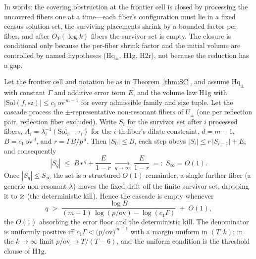 In words: the covering obstruction at the frontier cell is closed by
processing the uncovered fibers one at a time---each fiber's
configuration must lie in a fixed census solution set, the surviving
placements shrink by a bounded factor per fiber, and after $O_T(\log k)$
fibers the survivor set is empty. The closure is conditional only because
the per-fiber shrink factor and the initial volume are controlled by
named hypotheses (Hq$_\pm$, H1g, H2r), not because the reduction has a
gap.

\begin{proposition}\label{prop:Hq}
Let the frontier cell and notation be as in Theorem~\ref{thm:SC}, and assume
$\mathrm{Hq}_\pm$ with constant $\Gamma$ and additive error term $E$, and the
volume law $\mathrm{H1g}$ with
$|\mathrm{Sol}(f,\mathrm{sz})|\le c_1\,\mathrm{ov}^{\,m-1}$ for every
admissible family and size tuple. Let the cascade process the
$\pm$-representative non-resonant fibers of $U_\pm$ (one per reflection pair,
reflection fiber excluded). Write $S_i$ for the survivor set after $i$
processed fibers, $A_i=\lambda_i^{-1}(\mathrm{Sol}_i-\tau_i)$ for the $i$-th
fiber's dilate constraint, $d=m-1$, $B=c_1\,\mathrm{ov}^{\,d}$, and
$r=\Gamma B/p^{\,d}$. Then $|S_0|\le B$, each step obeys
$|S_i|\le r\,|S_{i-1}|+E$, and consequently
\[
|S_q|\;\le\;B\,r^{\,q}+\frac{E}{1-r}\;\xrightarrow[q\to\infty]{}\;\frac{E}{1-r}
\;=:\;S_\infty=O(1).
\]
Once $|S_q|\le S_\infty$ the set is a structured $O(1)$ remainder; a single
further fiber (a generic non-resonant $\lambda$) moves the fixed drift off
the finite survivor set, dropping it to $\varnothing$ (the deterministic
kill). Hence the cascade is empty whenever
\[
q\;>\;\frac{\log B}{(m-1)\,\log(p/\mathrm{ov})-\log(c_1\Gamma)}\;+\;O(1),
\]
the $O(1)$ absorbing the error floor and the deterministic kill. The
denominator is uniformly positive iff
$c_1\Gamma<\bigl(p/\mathrm{ov}\bigr)^{m-1}$ with a margin uniform in
$(T,k)$; in the $k\to\infty$ limit $p/\mathrm{ov}\to T/(T-6)$, and the
uniform condition is the threshold clause of $\mathrm{H1g}$.
\end{proposition}

